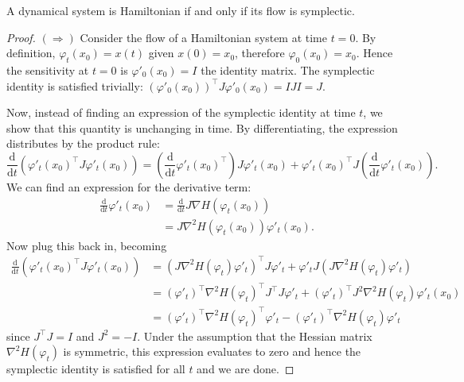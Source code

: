 \begin{theorem}
\label{thm:hamil}
A dynamical system is Hamiltonian if and only if its flow is symplectic.
\end{theorem}
\begin{proof}
$(\Rightarrow)$ Consider the flow of a Hamiltonian system at time $t=0$. By definition, $\varphi_t(x_0) = x(t)$ given $x(0) = x_0$,
therefore $\varphi_0(x_0) = x_0$. Hence the sensitivity at $t=0$ is $\varphi'_0(x_0) = I$ the identity matrix.
The symplectic identity is satisfied trivially: $(\varphi'_0(x_0))^\top J \varphi'_0(x_0) = IJI = J$.

Now, instead of finding an expression of the symplectic identity at time $t$,
we show that this quantity is unchanging in time.
By differentiating, the expression distributes by the product rule:
\begin{equation*}
	\frac{\mathrm{d}}{\mathrm{d}t} \left(
		\varphi'_t(x_0)^\top J \varphi'_t(x_0)
	\right) = \left(
		\frac{\mathrm{d}}{\mathrm{d}t} \varphi'_t(x_0)^\top
	\right) J \varphi'_t(x_0) + \varphi'_t(x_0)^\top J \left(
		\frac{\mathrm{d}}{\mathrm{d}t} \varphi'_t(x_0)
	\right).
\end{equation*}
We can find an expression for the derivative term:
\begin{align*}
	\frac{\mathrm{d}}{\mathrm{d}t} \varphi'_t(x_0) &= \frac{\mathrm{d}}{\mathrm{d}t} J \nabla H(\varphi_t(x_0)) \\
	&= J \nabla^2 H(\varphi_t(x_0)) \varphi'_t(x_0).
\end{align*}
Now plug this back in, becoming
\begin{align*}
	\frac{\mathrm{d}}{\mathrm{d}t} \left(
		\varphi'_t(x_0)^\top J \varphi'_t(x_0)
	\right) &= \left( J \nabla^2 H(\varphi_t)\varphi'_t \right)^\top J \varphi'_t 
	+ \varphi'_t J \left( 
		J \nabla^2 H(\varphi_t) \varphi'_t
  	\right) \\
	&= (\varphi'_t)^\top \nabla^2 H(\varphi_t)^\top J^\top J \varphi'_t
	+ (\varphi'_t)^\top J^2 \nabla^2 H(\varphi_t) \varphi'_t(x_0) \\
	&= (\varphi'_t)^\top \nabla^2 H(\varphi_t)^\top \varphi'_t - (\varphi'_t)^\top \nabla^2 H(\varphi_t) \varphi'_t
\end{align*}
since $J^\top J = I$ and $J^2 = -I$.
Under the assumption that the Hessian matrix $\nabla^2 H(\varphi_t)$ is symmetric,
this expression evaluates to zero and hence the symplectic identity is satisfied for all $t$ and we are done.


\end{proof}
